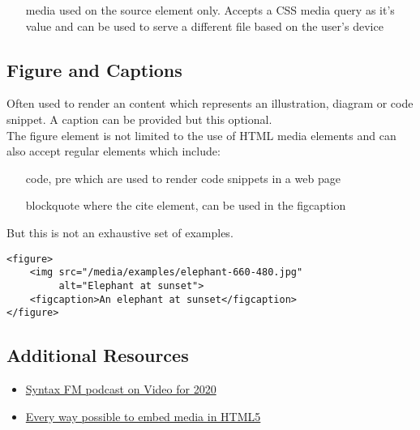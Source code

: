 \begin{itemize}
    \item[media] used on the source element only. Accepts a CSS media query as it's value and can be used to serve a different file based on the user's device
\end{itemize}

\subsection{Figure and Captions}

Often used to render an content which represents an illustration, diagram or code snippet. A caption can be provided but this optional.
\\

The figure element is not limited to the use of HTML media elements and can also accept regular elements which include:

\begin{itemize}
    \item[code, pre] which are used to render code snippets in a web page
    \item[blockquote] where the cite element, can be used in the figcaption
\end{itemize}

But this is not an exhaustive set of examples.

\begin{verbatim}
<figure>
    <img src="/media/examples/elephant-660-480.jpg"
         alt="Elephant at sunset">
    <figcaption>An elephant at sunset</figcaption>
</figure>
\end{verbatim}

\subsection{Additional Resources}

\begin{itemize}[leftmargin=*]
    \item \href{https://syntax.fm/show/266/video-for-the-web-2020-and-beyond}{Syntax FM podcast on Video for 2020}
    \item \href{https://html.com/media/}{Every way possible to embed media in HTML5}
\end{itemize}